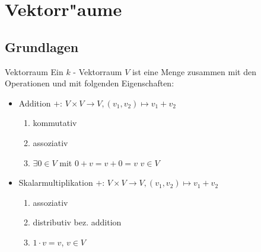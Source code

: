\documentclass[fontsize=11pt,paper=a4,BCOR=0mm,DIV=11,automark,headsepline]{scrbook}
\theoremstyle{remark}
\theoremstyle{definition}
\theoremstyle{proof}
\theoremstyle{remark}
\begin{document}
\part{Vektorr"aume}
\chapter{Grundlagen}
\label{sec:org4906e00}
\begin{definition}{Vektorraum}{}
Ein \(k\) - Vektorraum \(V\) ist eine Menge zusammen mit den Operationen und mit
folgenden Eigenschaften:
\begin{itemize}
\item Addition \(+:\, V\times V \to V, (v_1,v_2)\mapsto v_1+v_2\)
\begin{enumerate}
\item kommutativ
\item assoziativ
\item \(\exists 0 \in V\) mit \(0+v=v+0=v\) \(v \in V\)
\end{enumerate}
\item Skalarmultiplikation \(+:\, V\times V \to V, (v_1,v_2)\mapsto v_1+v_2\)
\begin{enumerate}
\item assoziativ
\item distributiv bez. addition
\item \(1\cdot v = v\), \(v\in V\)
\end{enumerate}
\end{itemize}
\end{definition}
\end{document}
